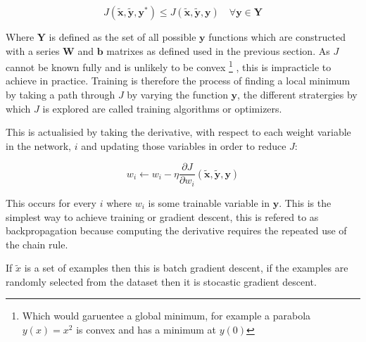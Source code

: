        \begin{equation}
          J(\tilde{\mathbf{x}},\tilde{\mathbf{y}},\mathbf{y}^*) \leq J(\tilde{\mathbf{x}},\tilde{\mathbf{y}},\mathbf{y}) \quad \forall \mathbf{y} \in \mathbf{Y}
        \end{equation}

        Where $\mathbf{Y}$ is defined as the set of all possible $\mathbf{y}$ functions which are constructed with a series $\mathbf{W}$ and $\mathbf{b}$ matrixes as defined used in the previous section.
        As $J$ cannot be known fully and is unlikely to be convex \footnote{Which would garuentee a global minimum, for example a parabola $y(x)=x^2$ is convex and has a minimum at $y(0)$}
        , this is impracticle to achieve in practice.
        Training is therefore the process of finding a local minimum by taking a path through $J$ by varying
        the function $ \mathbf{y} $, the different stratergies by which $J$ is explored are called
        training algorithms or optimizers.

        This is actualisied by taking the derivative, with respect to each weight variable
        in the network, $i$ and updating those variables in order to reduce $J$:

        \begin{equation}
          w_i \leftarrow w_i - \eta \frac{\partial J }{\partial w_{i}}(\tilde{\mathbf{x}},\tilde{\mathbf{y}},\mathbf{y})
        \end{equation}

        This occurs for every $i$ where $w_i$ is some trainable variable in $\mathbf{y}$.
        This is the simplest way to achieve training or gradient descent, this is refered to as backpropagation
        because computing the derivative requires the repeated use of the chain rule.

        If $\tilde{x}$ is a set of examples then this is batch gradient descent, if the examples
        are randomly selected from the dataset then it is stocastic gradient descent.





